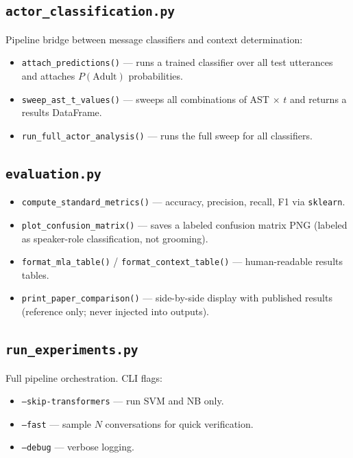 \documentclass[12pt,a4paper]{article}
\begin{document}
\subsection{\texttt{actor\_classification.py}}

Pipeline bridge between message classifiers and context determination:

\begin{itemize}[leftmargin=*]
  \item \texttt{attach\_predictions()} --- runs a trained classifier over
        all test utterances and attaches $P(\text{Adult})$ probabilities.
  \item \texttt{sweep\_ast\_t\_values()} --- sweeps all combinations of
        AST $\times$ $t$ and returns a results DataFrame.
  \item \texttt{run\_full\_actor\_analysis()} --- runs the full sweep for
        all classifiers.
\end{itemize}

\subsection{\texttt{evaluation.py}}

\begin{itemize}[leftmargin=*]
  \item \texttt{compute\_standard\_metrics()} --- accuracy, precision,
        recall, F1 via \texttt{sklearn}.
  \item \texttt{plot\_confusion\_matrix()} --- saves a labeled confusion
        matrix PNG (labeled as speaker-role classification, not grooming).
  \item \texttt{format\_mla\_table()} / \texttt{format\_context\_table()}
        --- human-readable results tables.
  \item \texttt{print\_paper\_comparison()} --- side-by-side display with
        published results (reference only; never injected into outputs).
\end{itemize}

\subsection{\texttt{run\_experiments.py}}

Full pipeline orchestration. CLI flags:
\begin{itemize}[leftmargin=*]
  \item \texttt{--skip-transformers} --- run SVM and NB only.
  \item \texttt{--fast} --- sample $N$ conversations for quick
        verification.
  \item \texttt{--debug} --- verbose logging.
\end{itemize}
\end{document}
